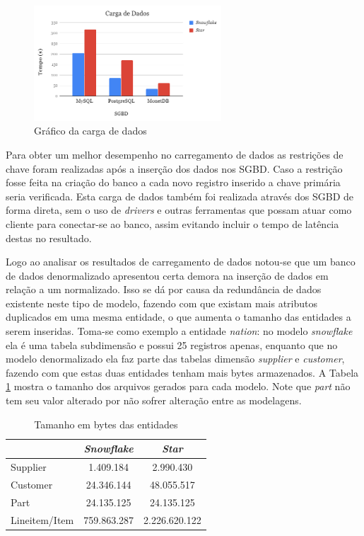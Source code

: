 \documentclass[conference]{IEEEtran}
\begin{document}
\begin{figure}[htpb]
  \centering
  \includegraphics[width=7cm]{carregamento_2}
  \caption{Gráfico da carga de dados}
  \label{fig:carga}
\end{figure}

Para obter um melhor desempenho no carregamento de dados as restrições de chave foram realizadas após a inserção dos dados nos SGBD. Caso a restrição fosse feita na criação do banco a cada novo registro inserido a chave primária seria verificada. Esta carga de dados também foi realizada através dos SGBD de forma direta, sem o uso de \textit{drivers} e outras ferramentas que possam atuar como cliente para conectar-se ao banco, assim evitando incluir o tempo de latência destas no resultado.

Logo ao analisar os resultados de carregamento de dados notou-se que um banco de dados denormalizado apresentou certa demora na inserção de dados em relação a um normalizado. Isso se dá por causa da redundância de dados existente neste tipo de modelo, fazendo com que existam mais atributos duplicados em uma mesma entidade, o que aumenta o tamanho das entidades a serem inseridas. Toma-se como exemplo a entidade \textit{nation}: no modelo \textit{snowflake} ela é uma tabela subdimensão e possui 25 registros apenas, enquanto que no modelo denormalizado ela faz parte das tabelas dimensão \textit{supplier} e \textit{customer}, fazendo com que estas duas entidades tenham mais bytes armazenados. A Tabela \ref{tab:tamanho} mostra o tamanho dos arquivos gerados para cada modelo. Note que \textit{part} não tem seu valor alterado por não sofrer alteração entre as modelagens.

\begin{table}[htpb]
\centering
\caption{Tamanho em bytes das entidades}
\label{tab:tamanho}
\begin{tabular}{@{}lcc@{}}
\toprule
              & \textit{Snowflake} & \textit{Star}       \\ \midrule
Supplier      & 1.409.184   & 2.990.430    \\
Customer      & 24.346.144  & 48.055.517   \\
Part          & 24.135.125  & 24.135.125   \\
Lineitem/Item & 759.863.287 & 2.226.620.122 \\ \bottomrule
\end{tabular}
\end{table}
\end{document}

